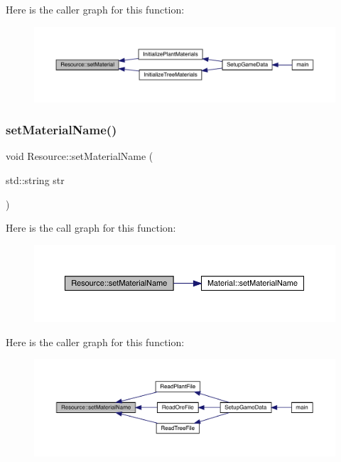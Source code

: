 Here is the caller graph for this function\+:
\nopagebreak
\begin{figure}[H]
\begin{center}
\leavevmode
\includegraphics[width=350pt]{class_resource_a84958f14311775c18c24cb69d43a74d0_icgraph}
\end{center}
\end{figure}
\mbox{\label{class_resource_a43801faadac24460d3266d5cbc2940f9}} 
\subsubsection{\texorpdfstring{set\+Material\+Name()}{setMaterialName()}}
{\footnotesize\ttfamily void Resource\+::set\+Material\+Name (\begin{DoxyParamCaption}\item[{std\+::string}]{str }\end{DoxyParamCaption})}

Here is the call graph for this function\+:
\nopagebreak
\begin{figure}[H]
\begin{center}
\leavevmode
\includegraphics[width=350pt]{class_resource_a43801faadac24460d3266d5cbc2940f9_cgraph}
\end{center}
\end{figure}
Here is the caller graph for this function\+:
\nopagebreak
\begin{figure}[H]
\begin{center}
\leavevmode
\includegraphics[width=350pt]{class_resource_a43801faadac24460d3266d5cbc2940f9_icgraph}
\end{center}
\end{figure}
\mbox{\label{class_resource_a644f765b367972686b6d0b9c7a0ce9dd}} 

